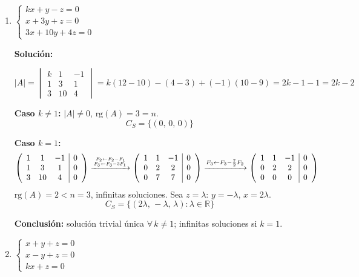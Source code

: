 \documentclass[12pt]{article}
\newcommand{\solucion}{%
    \vspace{0.8em}%
    \textbf{Solución:}%
}
\begin{document}
\begin{enumerate}[label=\alph*.-]
    El sistema tiene solución única para todo $k\in\mathbb{R}$:
    \[
    z = 1-k, \quad y = k+(1-k) = 1, \quad x = -(1-k) = k-1
    \]
    \[\boxed{C_S = \{(k-1,\,1,\,1-k)\} \quad \forall\,k\in\mathbb{R}}\]

    \textbf{Conclusión:} solución única para todo $k\in\mathbb{R}$.

    \item $\begin{cases} kx + y - z = 0 \\ x + 3y + z = 0 \\ 3x + 10y + 4z = 0 \end{cases}$

    \solucion
    \[
    |A| = \begin{vmatrix}k&1&-1\\1&3&1\\3&10&4\end{vmatrix}
    = k(12-10) - (4-3) + (-1)(10-9) = 2k - 1 - 1 = 2k-2
    \]

    \textbf{Caso $k \neq 1$:} $|A|\neq0$, $\text{rg}(A)=3=n$.
    \[\boxed{C_S = \{(0,\,0,\,0)\}}\]

    \textbf{Caso $k = 1$:}
    \[
    \left(\begin{array}{ccc|c}1&1&-1&0\\1&3&1&0\\3&10&4&0\end{array}\right)
    \xrightarrow{F_2 \leftarrow F_2 - F_1 \atop F_3 \leftarrow F_3 - 3F_1}
    \left(\begin{array}{ccc|c}1&1&-1&0\\0&2&2&0\\0&7&7&0\end{array}\right)
    \xrightarrow{F_3 \leftarrow F_3 - \frac{7}{2}F_2}
    \left(\begin{array}{ccc|c}1&1&-1&0\\0&2&2&0\\0&0&0&0\end{array}\right)
    \]
    $\text{rg}(A)=2 < n=3$, infinitas soluciones. Sea $z=\lambda$: $y=-\lambda$, $x=2\lambda$.
    \[\boxed{C_S = \{(2\lambda,\,-\lambda,\,\lambda):\lambda\in\mathbb{R}\}}\]

    \textbf{Conclusión:} solución trivial única $\forall\,k\neq1$; infinitas soluciones si $k=1$.

    \item $\begin{cases} x + y + z = 0 \\ x - y + z = 0 \\ kx + z = 0 \end{cases}$


\end{enumerate}
\end{document}

